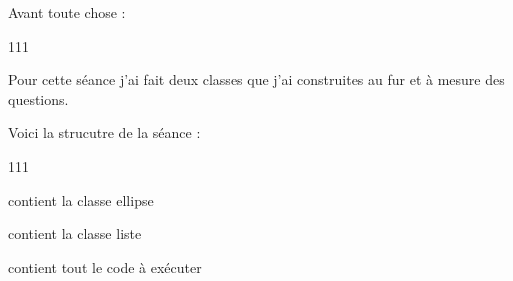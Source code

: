 Avant toute chose :
\begin{dinglist}{111}
  \item Pour cette séance j'ai fait deux classes que j'ai construites au fur
  et à mesure des questions.
  \item Voici la strucutre de la séance :
  \begin{dinglist}{111}
    \item
     contient la classe ellipse

    \item
     contient la classe liste

    \item
     contient tout le code à exécuter
  \end{dinglist}
\end{dinglist}
